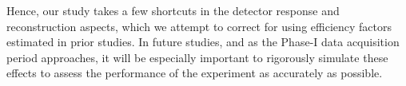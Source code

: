 Hence, our study takes a few shortcuts in the detector response and
reconstruction aspects, which we attempt to correct for using
efficiency factors estimated in prior studies. In future studies, and as the
Phase-I data acquisition period approaches, it will be especially important to 
rigorously simulate these effects to assess the performance of the experiment as
accurately as possible.

